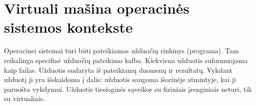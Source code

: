 \documentclass[oneside]{VUMIFPSkursinis}
\begin{document}
	\section{Virtuali mašina operacinės sistemos kontekste}
	Operacinei sistemai turi būti pateikiamas užduočių rinkinys (programa). Tam reikalinga specifinė užduočių pateikimo kalba. Kiekviena užduotis suformuojama kaip failas. Užduotis sudaryta iš pateikiamų duomenų ir rezultatų. Vykdant užduotį ji yra išskaidoma į dalis: užduotis saugoma išorinėje atmintyje, kai ji paruošta vykdymui. Užduotis tiesioginės sąveikos su fiziniais įrenginiais neturi, tik su virtualiais.
\end{document}
